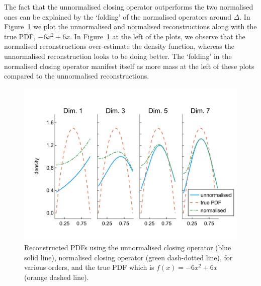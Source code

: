 \begin{example}
The fact that the unnormalised closing operator outperforms the two normalised ones can be explained by the `folding' of the normalised operators around \(\Delta\). In Figure~\ref{fig: pdf reconstructed quadratic} we plot the unnormalised and normalised reconstructions along with the true PDF, \(-6x^2+6x\). In Figure~\ref{fig: pdf reconstructed quadratic} at the left of the plots, we observe that the normalised reconstructions over-estimate the density function, whereas the unnormalised reconstruction looks to be doing better. The `folding' in the normalised closing operator manifest itself as more mass at the left of these plots compared to the unnormalised reconstructions. 
\begin{figure}[h]
	\centering
	\includegraphics[width=\textwidth,trim={0cm 1.25cm 0cm 1.25cm},clip]{chapter6/figs/qbdrap_closing_vec/fun6/pdfs_formatted.pdf}
	\caption{Reconstructed PDFs using the unnormalised closing operator (blue solid line), normalised closing operator (green dash-dotted line), for various orders, and the true PDF which is \(f(x)=-6x^2+6x\) (orange dashed line).} 
	\label{fig: pdf reconstructed quadratic}
\end{figure} 
\exampleFloatBarrier
\end{example}

